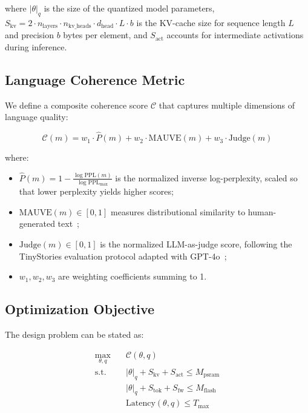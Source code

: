 \noindent where $|\theta|_q$ is the size of the quantized model parameters,
$S_{\text{kv}} = 2 \cdot n_{\text{layers}} \cdot n_{\text{kv\_heads}} \cdot
d_{\text{head}} \cdot L \cdot b$ is the KV-cache size for sequence length $L$
and precision $b$ bytes per element, and $S_{\text{act}}$ accounts for
intermediate activations during inference.

\subsection{Language Coherence Metric}

We define a composite coherence score $\mathcal{C}$ that captures multiple
dimensions of language quality:

\begin{equation}
\mathcal{C}(m) = w_1 \cdot \hat{P}(m) + w_2 \cdot \text{MAUVE}(m) + w_3 \cdot \text{Judge}(m)
\label{eq:coherence}
\end{equation}

\noindent where:
\begin{itemize}[leftmargin=*,topsep=2pt,itemsep=1pt]
  \item $\hat{P}(m) = 1 - \frac{\log \text{PPL}(m)}{\log \text{PPL}_{\max}}$
        is the normalized inverse log-perplexity, scaled so that lower
        perplexity yields higher scores;
  \item $\text{MAUVE}(m) \in [0,1]$ measures distributional similarity to
        human-generated text~\cite{pillutla2021mauve};
  \item $\text{Judge}(m) \in [0,1]$ is the normalized LLM-as-judge score,
        following the TinyStories evaluation protocol adapted with
        GPT-4o~\cite{eldan2023tinystories};
  \item $w_1, w_2, w_3$ are weighting coefficients summing to 1.
\end{itemize}

\subsection{Optimization Objective}

The \tinybit{} design problem can be stated as:

\begin{equation}
\begin{aligned}
\max_{\theta, q} \quad & \mathcal{C}(\theta, q) \\
\text{s.t.} \quad & |\theta|_q + S_{\text{kv}} + S_{\text{act}} \leq M_{\text{psram}} \\
& |\theta|_q + S_{\text{tok}} + S_{\text{fw}} \leq M_{\text{flash}} \\
& \text{Latency}(\theta, q) \leq T_{\max}
\end{aligned}
\label{eq:optimization}
\end{equation}

